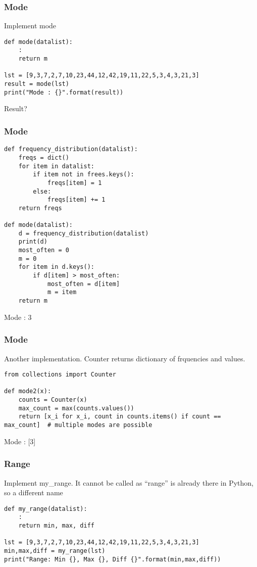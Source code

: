 \begin{frame}[fragile]\frametitle{Mode}
Implement mode
\begin{lstlisting}
def mode(datalist):
	:
	return m

lst = [9,3,7,2,7,10,23,44,12,42,19,11,22,5,3,4,3,21,3]
result = mode(lst)
print("Mode : {}".format(result))
\end{lstlisting}
Result?
\end{frame}

\begin{frame}[fragile]\frametitle{Mode}
\begin{lstlisting}
def frequency_distribution(datalist):
	freqs = dict()
	for item in datalist:
		if item not in frees.keys():
			freqs[item] = 1
		else:
			freqs[item] += 1
	return freqs

def mode(datalist):
    d = frequency_distribution(datalist)
    print(d)
    most_often = 0
    m = 0
    for item in d.keys():
        if d[item] > most_often:
            most_often = d[item]
            m = item
    return m
\end{lstlisting}
Mode : 3
\end{frame}

\begin{frame}[fragile]\frametitle{Mode}
Another implementation. Counter returns dictionary of frquencies and values.
\begin{lstlisting}
from collections import Counter

def mode2(x):
    counts = Counter(x)
    max_count = max(counts.values())
    return [x_i for x_i, count in counts.items() if count == max_count]  # multiple modes are possible
\end{lstlisting}
Mode : [3]
\end{frame}

\begin{frame}[fragile]\frametitle{Range}
Implement my\_range. It cannot be called as ``range'' is already there in Python, so a different name
\begin{lstlisting}
def my_range(datalist):
	:
	return min, max, diff

lst = [9,3,7,2,7,10,23,44,12,42,19,11,22,5,3,4,3,21,3]
min,max,diff = my_range(lst)
print("Range: Min {}, Max {}, Diff {}".format(min,max,diff))
\end{lstlisting}
\end{frame}

